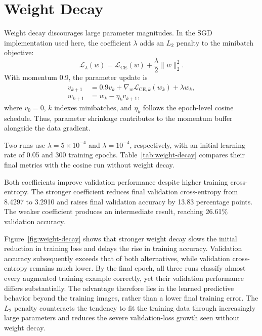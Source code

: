 \documentclass[letterpaper]{article}
\begin{document}
\section{Weight Decay}

Weight decay discourages large parameter magnitudes. In the SGD implementation used here, the coefficient $\lambda$ adds an $L_2$ penalty to the minibatch objective:
\begin{equation}
\mathcal{L}_{\lambda}(w)=\mathcal{L}_{\mathrm{CE}}(w)
 +\frac{\lambda}{2}\lVert w\rVert_2^2.
\label{eq:weight-decay}
\end{equation}
With momentum 0.9, the parameter update is
\begin{equation}
\begin{aligned}
v_{k+1}&=0.9v_k+\nabla_w\mathcal{L}_{\mathrm{CE},k}(w_k)+\lambda w_k,\\
w_{k+1}&=w_k-\eta_k v_{k+1},
\end{aligned}
\label{eq:momentum}
\end{equation}
where $v_0=0$, $k$ indexes minibatches, and $\eta_k$ follows the epoch-level cosine schedule. Thus, parameter shrinkage contributes to the momentum buffer alongside the data gradient.

Two runs use $\lambda=5\times10^{-4}$ and $\lambda=10^{-4}$, respectively, with an initial learning rate of 0.05 and 300 training epochs. Table~\ref{tab:weight-decay} compares their final metrics with the cosine run without weight decay.

Both coefficients improve validation performance despite higher training cross-entropy. The stronger coefficient reduces final validation cross-entropy from 8.4297 to 3.2910 and raises final validation accuracy by 13.83 percentage points. The weaker coefficient produces an intermediate result, reaching 26.61\% validation accuracy.

Figure~\ref{fig:weight-decay} shows that stronger weight decay slows the initial reduction in training loss and delays the rise in training accuracy. Validation accuracy subsequently exceeds that of both alternatives, while validation cross-entropy remains much lower. By the final epoch, all three runs classify almost every augmented training example correctly, yet their validation performance differs substantially. The advantage therefore lies in the learned predictive behavior beyond the training images, rather than a lower final training error. The $L_2$ penalty counteracts the tendency to fit the training data through increasingly large parameters and reduces the severe validation-loss growth seen without weight decay.
\end{document}
